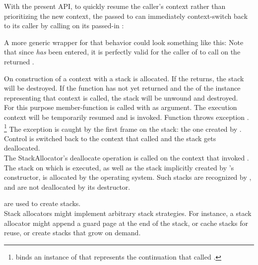 With the present API, to quickly resume the caller's context rather than
prioritizing the new context, the \entryfn passed to \callcc can immediately
context-switch back to its caller by calling \resume on its passed-in \cont:

A more generic wrapper for that behavior could look something like this:
Note that since  \emph{has} been entered, it
is perfectly valid for the caller of  to
call \resumewith on the returned \cont.


\label{subsec:destruction}

On construction of a context with \callcc a stack is allocated. If the
\entryfn returns, the stack will be destroyed. If the function has not yet
returned and the  of the \cont instance
representing that context is called, the stack will be unwound and destroyed.\\

For this purpose member-function \resumewith is called with \unwindcont as
argument. The execution context will be temporarily resumed and \unwindcont is
invoked. Function \unwindcont throws exception \unwindex.
\footnote{\unwindex binds an instance of \cont that represents the continuation
that called \resumewith.}
The exception is caught by the first frame on the stack: the one created by
\callcc. Control is switched back to the context that called \dtor and the
stack gets deallocated.\\

The StackAllocator's deallocate operation is called on the context that invoked
\dtor.\\

The stack on which  is executed, as well as the stack implicitly
created by 's constructor, is allocated by the operating
system. Such stacks are recognized by \cont, and are not deallocated by its
destructor.


\label{subsec:stackalloc}

are used to create stacks.\\

Stack allocators might implement arbitrary stack strategies. For instance, a
stack allocator might append a guard page at the end of the stack, or cache
stacks for reuse, or create stacks that grow on demand.\\

